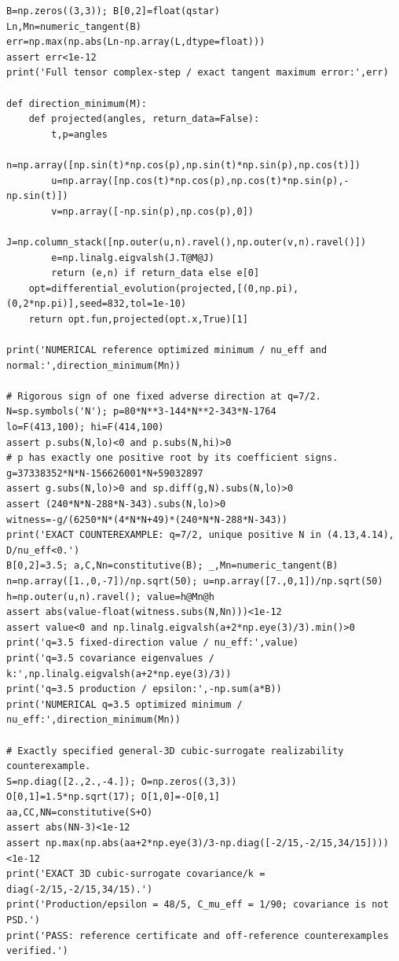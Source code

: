 \documentclass[11pt,a4paper]{article}
\numberwithin{equation}{section}
\begin{document}
\begin{lstlisting}[style=py]
B=np.zeros((3,3)); B[0,2]=float(qstar)
Ln,Mn=numeric_tangent(B)
err=np.max(np.abs(Ln-np.array(L,dtype=float)))
assert err<1e-12
print('Full tensor complex-step / exact tangent maximum error:',err)

def direction_minimum(M):
    def projected(angles, return_data=False):
        t,p=angles
        n=np.array([np.sin(t)*np.cos(p),np.sin(t)*np.sin(p),np.cos(t)])
        u=np.array([np.cos(t)*np.cos(p),np.cos(t)*np.sin(p),-np.sin(t)])
        v=np.array([-np.sin(p),np.cos(p),0])
        J=np.column_stack([np.outer(u,n).ravel(),np.outer(v,n).ravel()])
        e=np.linalg.eigvalsh(J.T@M@J)
        return (e,n) if return_data else e[0]
    opt=differential_evolution(projected,[(0,np.pi),(0,2*np.pi)],seed=832,tol=1e-10)
    return opt.fun,projected(opt.x,True)[1]

print('NUMERICAL reference optimized minimum / nu_eff and normal:',direction_minimum(Mn))

# Rigorous sign of one fixed adverse direction at q=7/2.
N=sp.symbols('N'); p=80*N**3-144*N**2-343*N-1764
lo=F(413,100); hi=F(414,100)
assert p.subs(N,lo)<0 and p.subs(N,hi)>0
# p has exactly one positive root by its coefficient signs.
g=37338352*N*N-156626001*N+59032897
assert g.subs(N,lo)>0 and sp.diff(g,N).subs(N,lo)>0
assert (240*N*N-288*N-343).subs(N,lo)>0
witness=-g/(6250*N*(4*N*N+49)*(240*N*N-288*N-343))
print('EXACT COUNTEREXAMPLE: q=7/2, unique positive N in (4.13,4.14), D/nu_eff<0.')
B[0,2]=3.5; a,C,Nn=constitutive(B); _,Mn=numeric_tangent(B)
n=np.array([1.,0,-7])/np.sqrt(50); u=np.array([7.,0,1])/np.sqrt(50)
h=np.outer(u,n).ravel(); value=h@Mn@h
assert abs(value-float(witness.subs(N,Nn)))<1e-12
assert value<0 and np.linalg.eigvalsh(a+2*np.eye(3)/3).min()>0
print('q=3.5 fixed-direction value / nu_eff:',value)
print('q=3.5 covariance eigenvalues / k:',np.linalg.eigvalsh(a+2*np.eye(3)/3))
print('q=3.5 production / epsilon:',-np.sum(a*B))
print('NUMERICAL q=3.5 optimized minimum / nu_eff:',direction_minimum(Mn))

# Exactly specified general-3D cubic-surrogate realizability counterexample.
S=np.diag([2.,2.,-4.]); O=np.zeros((3,3))
O[0,1]=1.5*np.sqrt(17); O[1,0]=-O[0,1]
aa,CC,NN=constitutive(S+O)
assert abs(NN-3)<1e-12
assert np.max(np.abs(aa+2*np.eye(3)/3-np.diag([-2/15,-2/15,34/15])))<1e-12
print('EXACT 3D cubic-surrogate covariance/k = diag(-2/15,-2/15,34/15).')
print('Production/epsilon = 48/5, C_mu_eff = 1/90; covariance is not PSD.')
print('PASS: reference certificate and off-reference counterexamples verified.')

\end{lstlisting}
\end{document}
